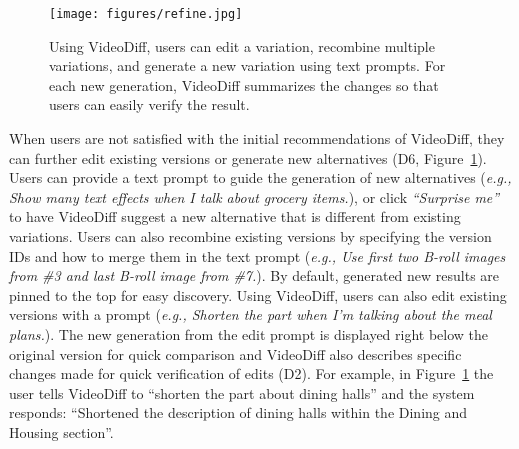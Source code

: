 \begin{figure}
  \centering
  \texttt{[image: figures/refine.jpg]}
  \caption{Using VideoDiff, users can edit a variation, recombine multiple variations, and generate a new variation using text prompts. For each new generation, VideoDiff summarizes the changes so that users can easily verify the result.}\label{fig:refine}
\end{figure}
    
When users are not satisfied with the initial recommendations of VideoDiff, they can further edit existing versions or generate new alternatives (D6, Figure~\ref{fig:refine}).
Users can provide a text prompt to guide the generation of new alternatives (\textit{e.g., Show many text effects when I talk about grocery items.}), or click \textit{``Surprise me''} to have VideoDiff suggest a new alternative that is different from existing variations. 
Users can also recombine existing versions by specifying the version IDs and how to merge them in the text prompt (\textit{e.g., Use first two B-roll images from \#3 and last B-roll image from \#7.}). By default, generated new results are pinned to the top for easy discovery.
Using VideoDiff, users can also edit existing versions with a prompt (\textit{e.g., Shorten the part when I'm talking about the meal plans.}). The new generation from the edit prompt is displayed right below the original version for quick comparison and VideoDiff also describes specific changes made for quick verification of edits (D2). For example, in Figure~\ref{fig:refine} the user tells VideoDiff to ``shorten the part about dining halls'' and the system responds:
``Shortened the description of dining halls within the Dining and Housing section''. 




